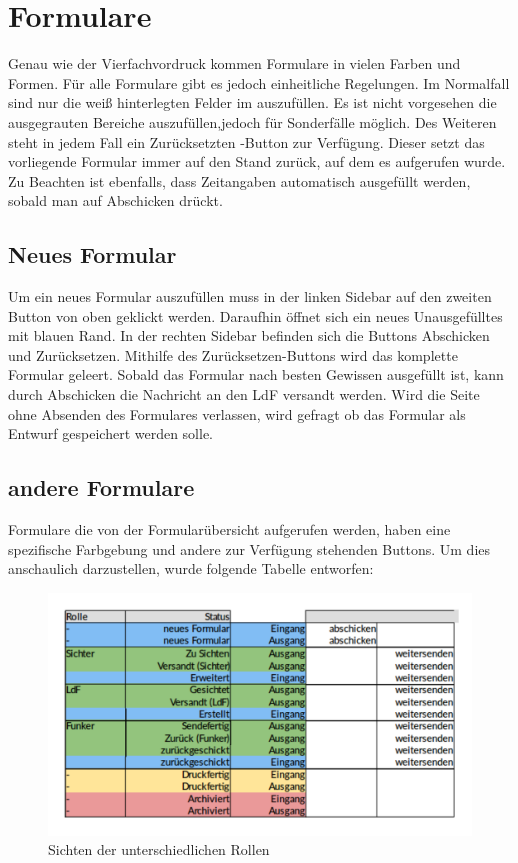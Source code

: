 \documentclass[a4paper,11pt,oneside, titlepage]{article}
\begin{document}
	\section{Formulare}
	Genau wie der Vierfachvordruck kommen Formulare in vielen Farben und Formen. Für alle Formulare gibt es jedoch einheitliche Regelungen.
	\newline
	Im Normalfall sind nur die weiß hinterlegten Felder im auszufüllen. Es ist nicht vorgesehen die ausgegrauten Bereiche auszufüllen,jedoch für Sonderfälle möglich.
	\newline
	Des Weiteren steht in jedem Fall ein \glqq{} Zurücksetzten\grqq{} -Button zur Verfügung. Dieser setzt das vorliegende Formular immer auf den Stand zurück, auf dem es aufgerufen wurde.
	\newline
	Zu Beachten ist ebenfalls, dass Zeitangaben automatisch ausgefüllt werden, sobald man auf \glqq{} Abschicken \grqq{} drückt.
	
	\subsection{Neues Formular}
	Um ein neues Formular auszufüllen muss in der linken Sidebar auf den zweiten Button von oben geklickt werden. Daraufhin öffnet sich ein neues Unausgefülltes mit blauen Rand.
	\newline
	In der rechten Sidebar befinden sich die Buttons \glqq{}Abschicken\grqq{} und \glqq{}Zurücksetzen\grqq{}.
	Mithilfe des Zurücksetzen-Buttons wird das komplette Formular geleert. Sobald das Formular nach besten Gewissen ausgefüllt ist, kann durch \glqq{} Abschicken \grqq{} die Nachricht an den LdF versandt werden.
	\newline
	Wird die Seite ohne Absenden des Formulares verlassen, wird gefragt ob das Formular als Entwurf gespeichert werden solle.
	
	\subsection{andere Formulare}
	Formulare die von der Formularübersicht aufgerufen werden, haben eine spezifische Farbgebung und andere zur Verfügung stehenden Buttons. Um dies anschaulich darzustellen, wurde folgende Tabelle entworfen:
	
	\begin{figure}[htpb]
			
		\centering
		\includegraphics[width=0.8\linewidth]{sichten}
		\caption{Sichten der unterschiedlichen Rollen}
	
		\end{figure}
	
\end{document}
